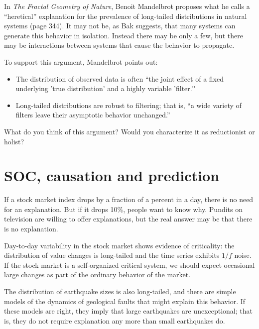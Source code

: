 \documentclass[10pt]{book}
\begin{document}
\begin{exercise}

In {\em The Fractal Geometry of Nature}, Benoit Mandelbrot proposes
what he calls a ``heretical'' explanation for the prevalence of
long-tailed distributions in natural systems (page 344).  It may not
be, as Bak suggests, that many systems can generate this behavior in
isolation.  Instead there may be only a few, but there may be
interactions between systems that cause the behavior to propagate.
  

To support this argument, Mandelbrot points out:

\begin{itemize}

\item The distribution of observed data is often ``the joint
  effect of a fixed underlying 'true distribution' and a highly
  variable 'filter.'"

\item Long-tailed distributions are robust to filtering; that is,
  ``a wide variety of filters leave their asymptotic behavior
  unchanged.''

\end{itemize}

What do you think of this argument?  Would you characterize
it as reductionist or holist?

\end{exercise}


\section{SOC, causation and prediction}

If a stock market index drops by a fraction of a percent in a
day, there is no need for an explanation.  But if it drops 10\%,
people want to know why.  Pundits
on television are willing to offer explanations, but the real
answer may be that there is no explanation.

Day-to-day variability in the stock market shows evidence of
criticality: the distribution of value changes is long-tailed
and the time series exhibits $1/f$ noise.
If the stock market is a self-organized critical system, we
should expect occasional large changes as part of the ordinary
behavior of the market.

The distribution of earthquake sizes is also long-tailed,
and there are simple models of the dynamics of geological faults
that might explain this behavior.  If these models are right,
they imply that large earthquakes are unexceptional; that is,
they do not require explanation any more than
small earthquakes do.
\end{document}
